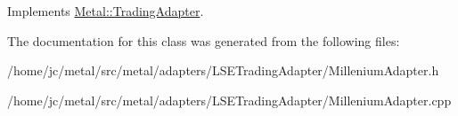 Implements \hyperlink{classMetal_1_1TradingAdapter_a39562015df3e7202a5e8f932b8bde43e}{Metal\+::\+Trading\+Adapter}.



The documentation for this class was generated from the following files\+:\begin{DoxyCompactItemize}
\item 
/home/jc/metal/src/metal/adapters/\+L\+S\+E\+Trading\+Adapter/Millenium\+Adapter.\+h\item 
/home/jc/metal/src/metal/adapters/\+L\+S\+E\+Trading\+Adapter/Millenium\+Adapter.\+cpp\end{DoxyCompactItemize}
